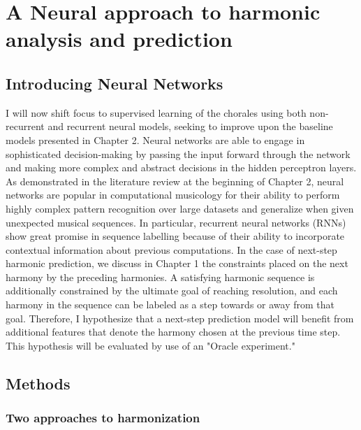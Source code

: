\documentclass[11pt]{book}
\begin{document}
\pagestyle{fancy}
\fancyhf{}
\fancyhead[R]{\thepage}


\chapter{A Neural approach to harmonic analysis and prediction}

\section{Introducing Neural Networks}

I will now shift focus to supervised learning of the chorales using both non-recurrent and recurrent neural models, seeking to improve upon the baseline models presented in Chapter 2. Neural networks are able to engage in sophisticated decision-making by passing the input forward through the network and making more complex and abstract decisions in the hidden perceptron layers. As demonstrated in the literature review at the beginning of Chapter 2, neural networks are popular in computational musicology for their ability to perform highly complex pattern recognition over large datasets and generalize when given unexpected musical sequences. In particular, recurrent neural networks (RNNs) show great promise in sequence labelling because of their ability to incorporate contextual information about previous computations. In the case of next-step harmonic prediction, we discuss in Chapter 1 the constraints placed on the next harmony by the preceding harmonies. A satisfying harmonic sequence is additionally constrained by the ultimate goal of reaching resolution, and each harmony in the sequence can be labeled as a step towards or away from that goal. Therefore, I hypothesize that a next-step prediction model will benefit from additional features that denote the harmony chosen at the previous time step. This hypothesis will be evaluated by use of an "Oracle experiment."

\section{Methods}

\subsection{Two approaches to harmonization}
\end{document}

